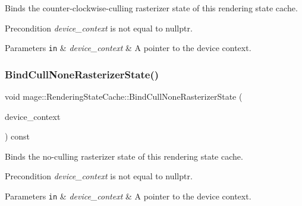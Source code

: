 Binds the counter-\/clockwise-\/culling rasterizer state of this rendering state cache.

\begin{DoxyPrecond}{Precondition}
{\itshape device\+\_\+context} is not equal to {\ttfamily nullptr}. 
\end{DoxyPrecond}

\begin{DoxyParams}[1]{Parameters}
\mbox{\tt in}  & {\em device\+\_\+context} & A pointer to the device context. \\
\hline
\end{DoxyParams}
\hypertarget{structmage_1_1_rendering_state_cache_ac1ac583238fe5339bbba5792fd03b8aa}{}\label{structmage_1_1_rendering_state_cache_ac1ac583238fe5339bbba5792fd03b8aa} 
\subsubsection{\texorpdfstring{Bind\+Cull\+None\+Rasterizer\+State()}{BindCullNoneRasterizerState()}}
{\footnotesize\ttfamily void mage\+::\+Rendering\+State\+Cache\+::\+Bind\+Cull\+None\+Rasterizer\+State (\begin{DoxyParamCaption}\item[{I\+D3\+D11\+Device\+Context2 $\ast$}]{device\+\_\+context }\end{DoxyParamCaption}) const\hspace{0.3cm}{\ttfamily [noexcept]}}

Binds the no-\/culling rasterizer state of this rendering state cache.

\begin{DoxyPrecond}{Precondition}
{\itshape device\+\_\+context} is not equal to {\ttfamily nullptr}. 
\end{DoxyPrecond}

\begin{DoxyParams}[1]{Parameters}
\mbox{\tt in}  & {\em device\+\_\+context} & A pointer to the device context. \\
\hline
\end{DoxyParams}
\hypertarget{structmage_1_1_rendering_state_cache_ab48c76cd1e0854d9a781215f1838a0c9}{}\label{structmage_1_1_rendering_state_cache_ab48c76cd1e0854d9a781215f1838a0c9} 
